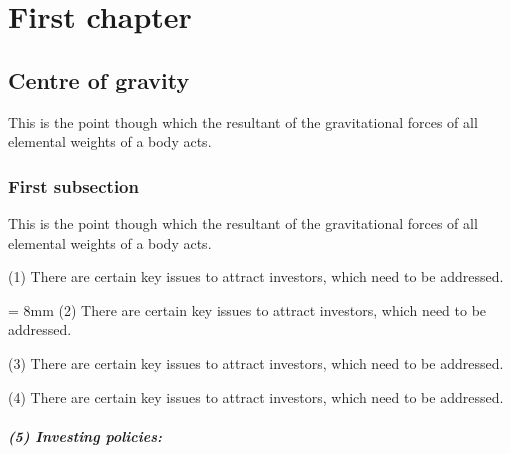 \documentclass[a5paper,landscape]{book}
\begin{document}
\chapter{First chapter}
\section{Centre of gravity}
This is the point though which the resultant
of the gravitational forces of all elemental
weights of a body acts.
\subsection{First subsection}
This is the point though which the resultant
of the gravitational forces of all elemental
weights of a body acts.
\par
(1) There are certain key issues to attract
investors, which need to be addressed.
%
\par \parindent = 8mm
(2) There are certain key issues to attract
investors, which need to be addressed.
%
\par \noindent \parskip 2mm
(3) There are certain key issues to attract
investors, which need to be addressed.
\par
(4) There are certain key issues to attract
investors, which need to be addressed.\\
\lipsum[1-2]
%
\paragraph{(5) Investing policies:}
\end{document}
